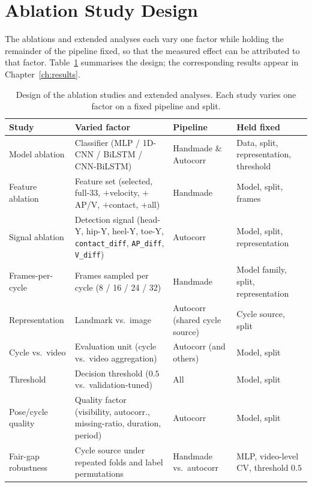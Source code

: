 \section{Ablation Study Design}
\label{sec:setup-ablations}

The ablations and extended analyses each vary one factor while holding the
remainder of the pipeline fixed, so that the measured effect can be attributed
to that factor. Table~\ref{tab:ablations} summarises the design; the
corresponding results appear in Chapter~\ref{ch:results}.

\begin{table}[htbp]
\centering
\caption{Design of the ablation studies and extended analyses. Each study varies
one factor on a fixed pipeline and split.}
\label{tab:ablations}
\renewcommand{\arraystretch}{1.3}
\footnotesize
\begin{tabularx}{\textwidth}{l X l X}
\toprule
Study & Varied factor & Pipeline & Held fixed \\
\midrule
Model ablation & Classifier (MLP / 1D-CNN / BiLSTM / CNN-BiLSTM) & Handmade \& Autocorr & Data, split, representation, threshold \\
Feature ablation & Feature set (selected, full-33, $+$velocity, $+$AP/V, $+$contact, $+$all) & Handmade & Model, split, frames \\
Signal ablation & Detection signal (head-Y, hip-Y, heel-Y, toe-Y, \texttt{contact\_diff}, \texttt{AP\_diff}, \texttt{V\_diff}) & Autocorr & Model, split, representation \\
Frames-per-cycle & Frames sampled per cycle (8 / 16 / 24 / 32) & Handmade & Model family, split, representation \\
Representation & Landmark vs.\ image & Autocorr (shared cycle source) & Cycle source, split \\
Cycle vs.\ video & Evaluation unit (cycle vs.\ video aggregation) & Autocorr (and others) & Model, split \\
Threshold & Decision threshold ($0.5$ vs.\ validation-tuned) & All & Model, split \\
Pose/cycle quality & Quality factor (visibility, autocorr., missing-ratio, duration, period) & Autocorr & Model, split \\
Fair-gap robustness & Cycle source under repeated folds and label permutations & Handmade vs.\ autocorr & MLP, video-level CV, threshold $0.5$ \\
\bottomrule
\end{tabularx}
\end{table}

